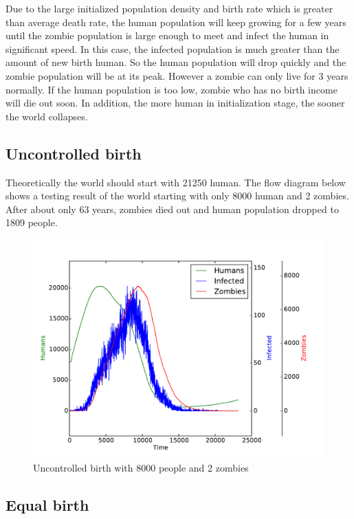 \documentclass[a4paper]{article}
\begin{document}
Due to the large initialized population density and birth rate which is greater than average death rate, the human population will keep growing for a few years until the zombie population is large enough to meet and infect the human in significant speed.
In this case, the infected population is much greater than the amount of new birth human.
So the human population will drop quickly and the zombie population will be at its peak.
However a zombie can only live for 3 years normally.
If the human population is too low, zombie who has no birth income will die out soon.
In addition, the more human in initialization stage, the sooner the world collapses.

\subsection{Uncontrolled birth}

Theoretically the world should start with 21250 human.
The flow diagram below shows a testing result of the world starting with only 8000 human and 2 zombies.
After about only 63 years, zombies died out and human population dropped to 1809 people.

\begin{figure}[pht]
    \centering
    \includegraphics[width=\textwidth]{uncontrolled_birth_8000}
    \caption{Uncontrolled birth with 8000 people and 2 zombies}
\end{figure}

\subsection{Equal birth}
\end{document}
